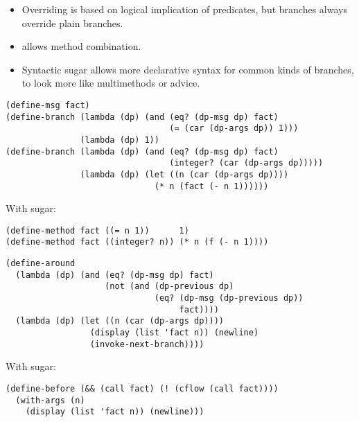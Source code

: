 \documentclass[landscape]{slides}
\begin{document}
\begin{slide}

  \begin{itemize}
    \item Overriding is based on logical implication of predicates,
          but  branches always override plain branches.
    \item {} allows method combination.
    \item Syntactic sugar allows more declarative syntax for common
          kinds of branches, to look more like multimethods or
          advice.
  \end{itemize}
\end{slide}

\begin{slide}

  \begin{verbatim}
(define-msg fact)
(define-branch (lambda (dp) (and (eq? (dp-msg dp) fact)
                                 (= (car (dp-args dp)) 1)))
               (lambda (dp) 1))
(define-branch (lambda (dp) (and (eq? (dp-msg dp) fact)
                                 (integer? (car (dp-args dp)))))
               (lambda (dp) (let ((n (car (dp-args dp))))
                              (* n (fact (- n 1))))))\end{verbatim}
With sugar:
\begin{verbatim}(define-method fact ((= n 1))      1)
(define-method fact ((integer? n)) (* n (f (- n 1))))\end{verbatim}
\end{slide}

\begin{slide}

  \begin{verbatim}
(define-around
  (lambda (dp) (and (eq? (dp-msg dp) fact)
                    (not (and (dp-previous dp)
                              (eq? (dp-msg (dp-previous dp))
                                   fact))))
  (lambda (dp) (let ((n (car (dp-args dp))))
                 (display (list 'fact n)) (newline)
                 (invoke-next-branch))))
\end{verbatim}
With sugar:
\begin{verbatim}
(define-before (&& (call fact) (! (cflow (call fact))))
  (with-args (n)
    (display (list 'fact n)) (newline)))
\end{verbatim}
\end{slide}
\end{document}
